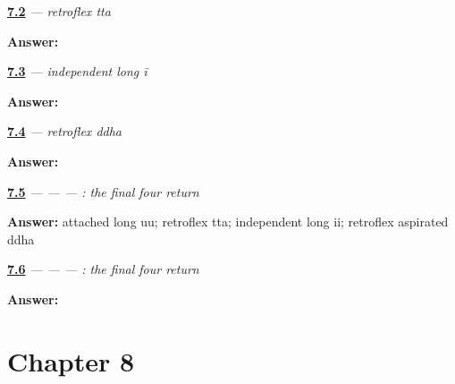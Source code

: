 \noindent\begin{minipage}[t]{\linewidth}
\raggedright
\hyperlink{review-GU-W07-tta-recall}{\textbf{7.2}} \emph{ — retroflex tta}\par
\small \textbf{Answer:} \par
\end{minipage}\par\medskip

\noindent\begin{minipage}[t]{\linewidth}
\raggedright
\hyperlink{review-GU-W07-independent-ii-recall}{\textbf{7.3}} \emph{ — independent long ī}\par
\small \textbf{Answer:} \par
\end{minipage}\par\medskip

\noindent\begin{minipage}[t]{\linewidth}
\raggedright
\hyperlink{review-GU-W07-ddha-recall}{\textbf{7.4}} \emph{ — retroflex ddha}\par
\small \textbf{Answer:} \par
\end{minipage}\par\medskip

\noindent\begin{minipage}[t]{\linewidth}
\raggedright
\hyperlink{review-GU-R07-second-four-r1-reading}{\textbf{7.5}} \emph{ —  —  — : the final four return}\par
\small \textbf{Answer:} attached long uu; retroflex tta; independent long ii; retroflex aspirated ddha\par
\end{minipage}\par\medskip

\noindent\begin{minipage}[t]{\linewidth}
\raggedright
\hyperlink{review-GU-R07-second-four-r1-dictation}{\textbf{7.6}} \emph{ —  —  — : the final four return}\par
\small \textbf{Answer:}    \par
\end{minipage}\par\medskip

\section*{Chapter 8}

